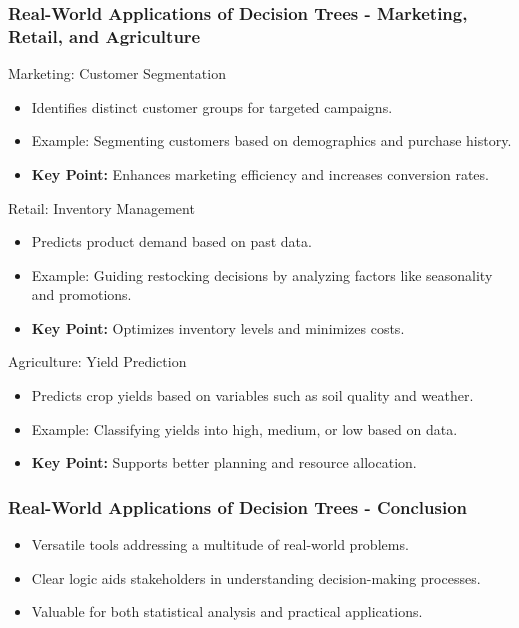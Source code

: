 \documentclass[aspectratio=169]{beamer}
\begin{document}
\begin{frame}[fragile]
    \frametitle{Real-World Applications of Decision Trees - Marketing, Retail, and Agriculture}
    \begin{block}{Marketing: Customer Segmentation}
        \begin{itemize}
            \item Identifies distinct customer groups for targeted campaigns.
            \item Example: Segmenting customers based on demographics and purchase history.
            \item \textbf{Key Point:} Enhances marketing efficiency and increases conversion rates.
        \end{itemize}
    \end{block}

    \begin{block}{Retail: Inventory Management}
        \begin{itemize}
            \item Predicts product demand based on past data.
            \item Example: Guiding restocking decisions by analyzing factors like seasonality and promotions.
            \item \textbf{Key Point:} Optimizes inventory levels and minimizes costs.
        \end{itemize}
    \end{block}

    \begin{block}{Agriculture: Yield Prediction}
        \begin{itemize}
            \item Predicts crop yields based on variables such as soil quality and weather.
            \item Example: Classifying yields into high, medium, or low based on data.
            \item \textbf{Key Point:} Supports better planning and resource allocation.
        \end{itemize}
    \end{block}
\end{frame}

\begin{frame}[fragile]
    \frametitle{Real-World Applications of Decision Trees - Conclusion}
    \begin{itemize}
        \item Versatile tools addressing a multitude of real-world problems.
        \item Clear logic aids stakeholders in understanding decision-making processes.
        \item Valuable for both statistical analysis and practical applications.
    \end{itemize}
\end{frame}
\end{document}
